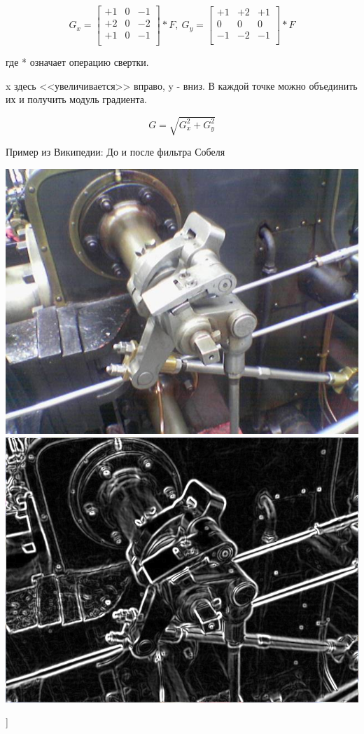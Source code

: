 $$
G_x = 
\begin{bmatrix}
+1 & 0 & -1 \\
+2 & 0 & -2 \\
+1 & 0 & -1 \\
\end{bmatrix}
* F, ~ 
G_y = 
\begin{bmatrix}
+1 & +2 & +1 \\
0  & 0  & 0  \\
-1 & -2 & -1 \\
\end{bmatrix}
* F
$$

где * означает операцию свертки.

x здесь <<увеличивается>> вправо, y - вниз. В каждой точке можно объединить их и получить модуль градиента.

$$G = \sqrt{G_x^2 + G_y^2}$$

Пример из Википедии: До и после фильтра Собеля

\includegraphics[scale=0.2]{pics/osn23_before.png}
\includegraphics[scale=0.2]{pics/osn23_after.png}

\bigbreak
[\cite[page 69-96]{replace_me}]